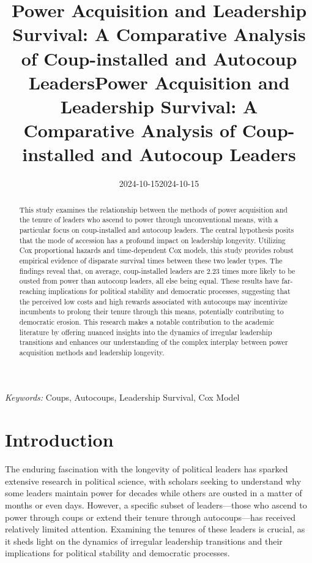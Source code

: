 \documentclass[
  12pt,
]{article}
\title{Power Acquisition and Leadership Survival: A Comparative Analysis
of Coup-installed and Autocoup Leaders}
\author{}
\date{2024-10-15}
\begin{document}
\def\spacingset#1{\renewcommand{\baselinestretch}%
{#1}\small\normalsize} \spacingset{1}



\date{2024-10-15}
\title{\bf Power Acquisition and Leadership Survival: A Comparative
Analysis of Coup-installed and Autocoup Leaders}
\author{
}

\maketitle

\bigskip
\bigskip
\begin{abstract}
This study examines the relationship between the methods of power
acquisition and the tenure of leaders who ascend to power through
unconventional means, with a particular focus on coup-installed and
autocoup leaders. The central hypothesis posits that the mode of
accession has a profound impact on leadership longevity. Utilizing Cox
proportional hazards and time-dependent Cox models, this study provides
robust empirical evidence of disparate survival times between these two
leader types. The findings reveal that, on average, coup-installed
leaders are 2.23 times more likely to be ousted from power than autocoup
leaders, all else being equal. These results have far-reaching
implications for political stability and democratic processes,
suggesting that the perceived low costs and high rewards associated with
autocoups may incentivize incumbents to prolong their tenure through
this means, potentially contributing to democratic erosion. This
research makes a notable contribution to the academic literature by
offering nuanced insights into the dynamics of irregular leadership
transitions and enhances our understanding of the complex interplay
between power acquisition methods and leadership longevity.
\end{abstract}

\noindent%
{\it Keywords:} Coups, Autocoups, Leadership Survival, Cox Model
\vfill

\newpage
\spacingset{1.9} %

\section{Introduction}\label{introduction}

The enduring fascination with the longevity of political leaders has
sparked extensive research in political science, with scholars seeking
to understand why some leaders maintain power for decades while others
are ousted in a matter of months or even days. However, a specific
subset of leaders---those who ascend to power through coups or extend
their tenure through autocoups---has received relatively limited
attention. Examining the tenures of these leaders is crucial, as it
sheds light on the dynamics of irregular leadership transitions and
their implications for political stability and democratic processes.
\end{document}
